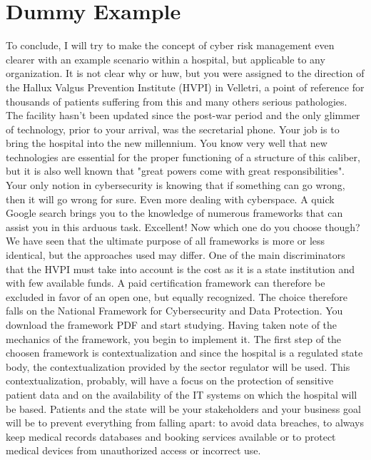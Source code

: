 \section{Dummy Example}
To conclude, I will try to make the concept of cyber risk management even clearer with an example scenario within a hospital, but applicable to any organization.\vspace{0.5cm}\newline
It is not clear why or huw, but you were assigned to the direction of the Hallux Valgus Prevention Institute (HVPI) in Velletri, a point of reference for thousands of patients suffering from this and many others serious pathologies. The facility hasn't been updated since the post-war period and the only glimmer of technology, prior to your arrival, was the secretarial phone. Your job is to bring the hospital into the new millennium. You know very well that new technologies are essential for the proper functioning of a structure of this caliber, but it is also well known that "great powers come with great responsibilities". Your only notion in cybersecurity is knowing that if something can go wrong, then it will go wrong for sure. Even more dealing with cyberspace. A quick Google search brings you to the knowledge of numerous frameworks that can assist you in this arduous task. Excellent! Now which one do you choose though? We have seen that the ultimate purpose of all frameworks is more or less identical, but the approaches used may differ. One of the main discriminators that the HVPI must take into account is the cost as it is a state institution and with few available funds. A paid certification framework can therefore be excluded in favor of an open one, but equally recognized. The choice therefore falls on the National Framework for Cybersecurity and Data Protection. You download the framework PDF and start studying.\vspace{0.5cm}\newline
Having taken note of the mechanics of the framework, you begin to implement it. The first step of the choosen framework is contextualization and since the hospital is a regulated state body, the contextualization provided by the sector regulator will be used. This contextualization, probably, will have a focus on the protection of sensitive patient data and on the availability of the IT systems on which the hospital will be based. Patients and the state will be your stakeholders and your business goal will be to prevent everything from falling apart: to avoid data breaches, to always keep medical records databases and booking services available or to protect medical devices from unauthorized access or incorrect use.\vspace{0.5cm}\newline
